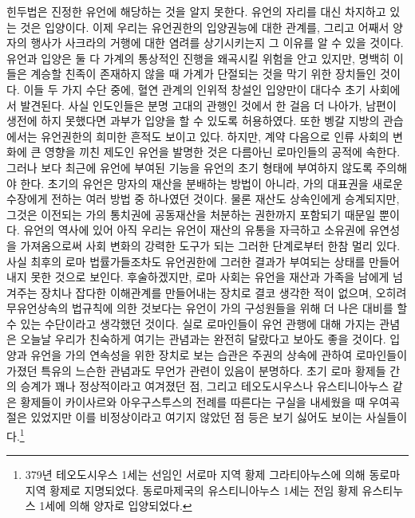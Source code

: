 힌두법은 진정한 유언에 해당하는 것을 알지 못한다.
유언의 자리를 대신 차지하고 있는 것은 입양이다.
이제 우리는 유언권한의 입양권능에 대한 관계를,
그리고 어째서 양자의 행사가 사크라의 거행에 대한 염려를 상기시키는지 그 이유를
알 수 있을 것이다.
유언과 입양은 둘 다 가계의 통상적인 진행을 왜곡시킬
위험을 안고 있지만, 명백히 이들은
계승할 친족이 존재하지 않을 때 가계가 단절되는 것을 막기 위한
장치들인 것이다.
이들 두 가지 수단 중에,
혈연 관계의 인위적 창설인
입양만이
대다수 초기 사회에서 발견된다.
사실 인도인들은 분명 고대의 관행인 것에서 한 걸음 더 나아가,
남편이 생전에 하지 못했다면 과부가 입양을 할 수 있도록 허용하였다.
또한 벵갈 지방의 관습에서는 유언권한의 희미한 흔적도 보이고 있다.
하지만,
계약 다음으로 인류 사회의 변화에 큰 영향을 끼친 제도인
유언을 발명한 것은 다름아닌 로마인들의 공적에 속한다.
그러나
보다 최근에 유언에 부여된 기능을
유언의 초기 형태에 부여하지 않도록 주의해야 한다.
초기의 유언은 망자의 재산을 분배하는 방법이 아니라,
가의 대표권을 새로운 수장에게 전하는 여러 방법 중 하나였던 것이다.
물론 재산도 상속인에게 승계되지만,
그것은 이전되는 가의 통치권에
공동재산을 처분하는 권한까지 포함되기 때문일 뿐이다.
유언의 역사에 있어
아직 우리는
유언이
재산의 유통을 자극하고
소유권에 유연성을 가져옴으로써
사회 변화의
강력한 도구가 되는 그러한 단계로부터 한참 멀리 있다.
사실 최후의 로마 법률가들조차도
유언권한에 그러한 결과가 부여되는 상태를 만들어내지 못한 것으로 보인다.
후술하겠지만,
로마 사회는 유언을
재산과 가족을 남에게 넘겨주는 장치나
잡다한 이해관계를 만들어내는 장치로
결코 생각한 적이 없으며, 오히려
무유언상속의 법규칙에 의한 것보다는 유언이
가의 구성원들을 위해 더 나은 대비를 할 수 있는 수단이라고
생각했던 것이다.
실로 로마인들이 유언 관행에 대해 가지는 관념은
오늘날 우리가 친숙하게 여기는 관념과는 완전히 달랐다고 보아도 좋을 것이다.
입양과 유언을 가의 연속성을 위한 장치로 보는 습관은
주권의 상속에 관하여 로마인들이 가졌던 특유의 느슨한 관념과도
무언가 관련이 있음이 분명하다.
초기 로마 황제들 간의 승계가 꽤나 정상적이라고 여겨졌던 점,
그리고 테오도시우스나
유스티니아누스 같은 황제들이 카이사르와 아우구스투스의 전례를
따른다는 구실을 내세웠을 때
우여곡절은 있었지만
이를 비정상이라고 여기지 않았던 점 등은
보기 싫어도 보이는 사실들이다.\footnote{%
  379년 테오도시우스 1세는 선임인 서로마 지역 황제 그라티아누스에 의해
  동로마 지역 황제로 지명되었다.
  동로마제국의 유스티니아누스 1세는 전임 황제 유스티누스 1세에 의해
  양자로 입양되었다.}


